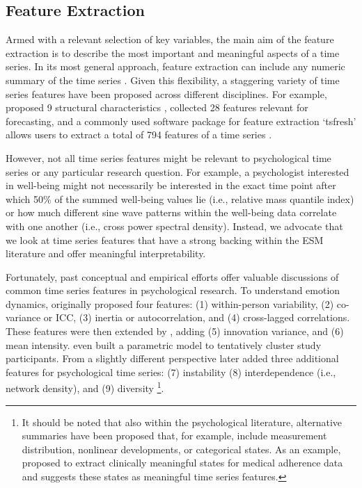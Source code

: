 \documentclass[man, 12pt, a4paper, mask, floatsintext]{apa7}
\theoremstyle{break}
\theoremstyle{plain}
\begin{document}
\subsection{Feature Extraction}
Armed with a relevant selection of key variables, the main aim of the feature extraction is to describe the most important and meaningful aspects of a time series. In its most general approach, feature extraction can include any numeric summary of the time series \citep[e.g.,][]{maharaj2019}. Given this flexibility, a staggering variety of time series features have been proposed across different disciplines. For example, \citet{wang2006} proposed 9 structural characteristics \citep[also see][]{fulcher2013}, \citet{adya2001} collected 28 features relevant for forecasting, and a commonly used software package for feature extraction `tsfresh' allows users to extract a total of 794 features of a time series \citep[][]{christ2018}. 

However, not all time series features might be relevant to psychological time series or any particular research question. For example, a psychologist interested in well-being might not necessarily be interested in the exact time point after which 50\% of the summed well-being values lie (i.e., relative mass quantile index) or how much different sine wave patterns within the well-being data correlate with one another (i.e., cross power spectral density). Instead, we advocate that we look at time series features that have a strong backing within the ESM literature and offer meaningful interpretability. 

Fortunately, past conceptual and empirical efforts offer valuable discussions of common time series features in psychological research. To understand emotion dynamics, \citet{kuppens2017} originally proposed four features: (1) within-person variability, (2) co-variance or ICC, (3) inertia or autocorrelation, and (4) cross-lagged correlations. These features were then extended by \citet{krone2018}, adding (5) innovation variance, and (6) mean intensity. \citet{krone2018} even built a parametric model to tentatively cluster study participants. From a slightly different perspective \citet{dejonckheere2019} later added three additional features for psychological time series: (7) instability (8) interdependence (i.e., network density), and (9) diversity \citep[i.e., Gini coefficient; also see][]{wendt2020}\footnote{It should be noted that also within the psychological literature, alternative summaries have been proposed that, for example, include measurement distribution, nonlinear developments, or categorical states. As an example, \citet{kiwuwa-muyingo2011} proposed to extract clinically meaningful states for medical adherence data and suggests these states as meaningful time series features.}. 
\end{document}
